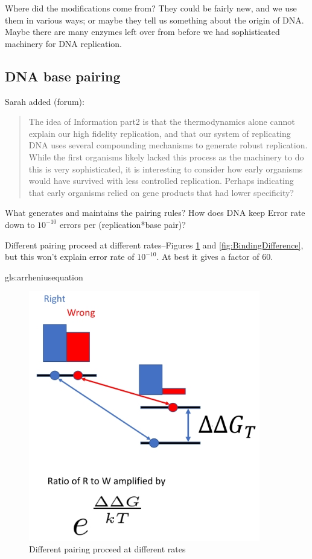 \documentclass[]{article}
\begin{document}
Where did the modifications come from? They could be fairly new, and we use them in various ways; or maybe they tell us something about the origin of DNA. Maybe there are many enzymes left over from before we had sophisticated machinery for DNA replication.

\subsection{DNA base pairing}\label{section:DNAasInfo2}

Sarah added (forum):\begin{quote}
	The idea of Information part2 is that the thermodynamics alone cannot explain our high fidelity replication, and that our system of replicating DNA uses several compounding mechanisms to generate robust replication. While the first organisms likely lacked this process as the machinery to do this is very sophisticated, it is interesting to consider how early organisms would have survived with less controlled replication. Perhaps indicating that early organisms relied on gene products that had lower specificity?
\end{quote}

What generates and maintains the pairing rules?  How does DNA keep Error rate down to  $10^{-10}$ errors per (replication*base pair)?

Different pairing proceed at different rates--Figures \ref{fig:RightWrong} and \ref{fig:BindingDifference}, but this won't explain error rate of $10^{-10}$. At best it gives a factor of 60.

\gls{gls:arrheniusequation}
\begin{figure}[H]
	\caption{Different pairing proceed at different rates} \label{fig:RightWrong} 
	\includegraphics[width=0.9\textwidth]{RightWrong}
\end{figure}
\end{document}
